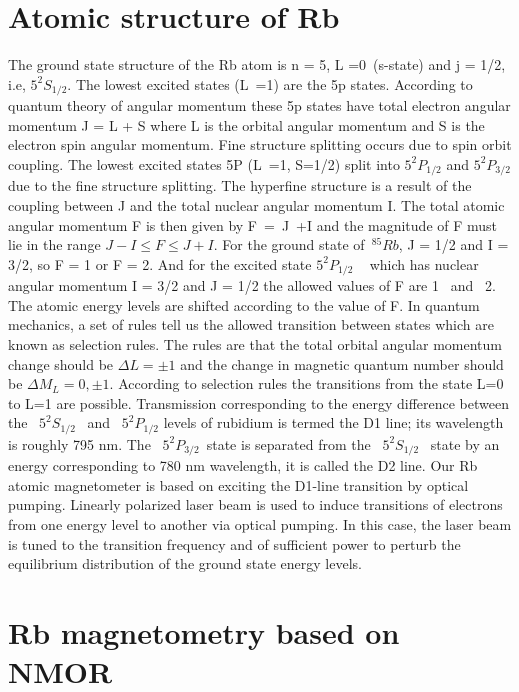\section{Atomic structure of Rb }
\label{Rb structure} 
The ground state structure of the Rb atom is n = 5, L =0~(s-state) and j = 1/2, i.e, $5^2S_{1/2}$. The lowest excited states (L~=1) are the 5p states. According to quantum theory of angular momentum these 5p states have total electron angular momentum J = L + S where L is the orbital angular momentum and S is the electron spin angular momentum. Fine structure splitting occurs due to spin orbit coupling.  The lowest excited states 5P (L~=1, S=1/2) split into  $5^2P_{1/2}$ and $5^2P_{3/2}$  due to the fine structure splitting. The hyperfine structure is a result of the coupling between J and the total nuclear angular momentum I. The total atomic angular momentum F is then given by F~=~J~+I  and the magnitude of F must lie in the range
$J - I \leq F \leq J + I$. For the ground state of~$^{85}{Rb}$, J = 1/2 and I = 3/2, so F = 1 or F = 2. And  for the excited state $5^2P_{1/2}$ ~  which has nuclear angular momentum I = 3/2 and J = 1/2  the allowed values of F are  1 ~and~ 2. The atomic energy levels are shifted according to the value of F. In quantum mechanics, a set of rules tell us the allowed transition between states which are known as selection rules. The rules are that the total orbital angular momentum change should be $\Delta L= \pm 1$ and the change in magnetic quantum number should be $\Delta M_L= 0,\pm 1$. According to selection rules the transitions from the state L=0 to L=1 are possible. Transmission corresponding to the energy difference between the ~$5^2S_{1/2}$~ and~ $5^2P_{1/2}$ levels of rubidium is termed the D1 line; its wavelength is roughly 795 nm\cite{doe:website}.  The ~$5^2P_{3/2}$~state is separated from the ~$5^2S_{1/2}$~ state by an energy corresponding to 780 nm wavelength, it is called the D2 line. Our Rb atomic magnetometer is based on exciting the D1-line transition by optical pumping.  Linearly polarized laser beam is used to induce transitions of electrons from one energy level to another via optical pumping. In this case, the laser beam is tuned to the transition frequency and of sufficient power to perturb the equilibrium distribution of the ground state energy levels. 

\section{Rb magnetometry based on NMOR}

